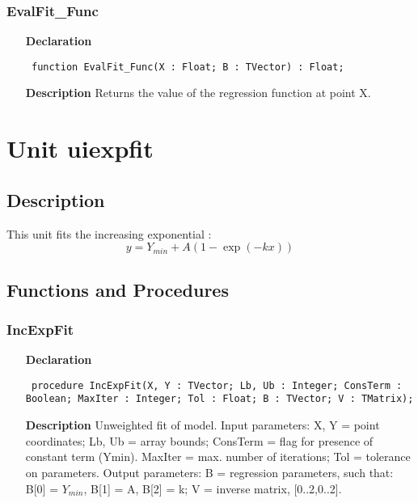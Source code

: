 \documentclass[12pt,a4paper,oneside]{report}
\newcommand{\declarationitem}[1]{\textbf{#1}}
\newcommand{\descriptiontitle}[1]{\textbf{#1}}
\newcommand{\code}[1]{\texttt{#1}}
\begin{document}
\subsubsection{EvalFit{\_}Func}
\label{uevalfit-EvalFit_Func}
\begin{itemize}\item[\declarationitem{Declaration}\hfill]
	\begin{flushleft}
		\code{
			function EvalFit{\_}Func(X : Float; B : TVector) : Float;}
		
	\end{flushleft}
	
	\par
	\item[\descriptiontitle{Description}]
	Returns the value of the regression function at point X.
\end{itemize}

\section{Unit uiexpfit}
\label{uiexpfit}
\subsection{Description}
This unit fits the increasing exponential :
$$y = Y_{min} + A(1-\exp(-kx))$$
\subsection{Functions and Procedures}
\subsubsection{IncExpFit}
\label{uiexpfit-IncExpFit}
\begin{itemize}\item[\declarationitem{Declaration}\hfill]
	\begin{flushleft}
		\code{
			procedure IncExpFit(X, Y : TVector; Lb, Ub : Integer; ConsTerm : Boolean; MaxIter : Integer; Tol : Float; B : TVector; V : TMatrix);}
		
	\end{flushleft}
	
	\par
	\item[\descriptiontitle{Description}]
	Unweighted fit of model. Input parameters: X, Y = point coordinates; Lb, Ub = array bounds; ConsTerm = flag for presence of constant term (Ymin). MaxIter = max. number of iterations; Tol = tolerance on parameters. Output parameters: B = regression parameters, such that:	
	B[0] = $Y_{min}$, B[1] = A, B[2] = k; V = inverse matrix, [0..2,0..2].
	
\end{itemize}
\end{document}
